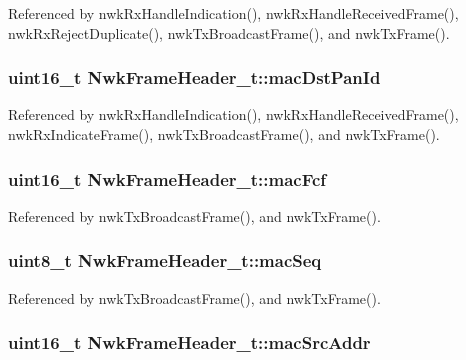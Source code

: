 Referenced by nwk\-Rx\-Handle\-Indication(), nwk\-Rx\-Handle\-Received\-Frame(), nwk\-Rx\-Reject\-Duplicate(), nwk\-Tx\-Broadcast\-Frame(), and nwk\-Tx\-Frame().

\hypertarget{struct_nwk_frame_header__t_a503c00407e350a489337324ea735f421}{
\subsubsection[{mac\-Dst\-Pan\-Id}]{\setlength{\rightskip}{0pt plus 5cm}uint16\-\_\-t Nwk\-Frame\-Header\-\_\-t\-::mac\-Dst\-Pan\-Id}}\label{struct_nwk_frame_header__t_a503c00407e350a489337324ea735f421}


Referenced by nwk\-Rx\-Handle\-Indication(), nwk\-Rx\-Handle\-Received\-Frame(), nwk\-Rx\-Indicate\-Frame(), nwk\-Tx\-Broadcast\-Frame(), and nwk\-Tx\-Frame().

\hypertarget{struct_nwk_frame_header__t_a136fb8b5fae16dc89aa581578163a292}{
\subsubsection[{mac\-Fcf}]{\setlength{\rightskip}{0pt plus 5cm}uint16\-\_\-t Nwk\-Frame\-Header\-\_\-t\-::mac\-Fcf}}\label{struct_nwk_frame_header__t_a136fb8b5fae16dc89aa581578163a292}


Referenced by nwk\-Tx\-Broadcast\-Frame(), and nwk\-Tx\-Frame().

\hypertarget{struct_nwk_frame_header__t_a1a2af294d7235b16d1bff5050fe8c24d}{
\subsubsection[{mac\-Seq}]{\setlength{\rightskip}{0pt plus 5cm}uint8\-\_\-t Nwk\-Frame\-Header\-\_\-t\-::mac\-Seq}}\label{struct_nwk_frame_header__t_a1a2af294d7235b16d1bff5050fe8c24d}


Referenced by nwk\-Tx\-Broadcast\-Frame(), and nwk\-Tx\-Frame().

\hypertarget{struct_nwk_frame_header__t_a8648deb85dac8f29a2109e0e430b1be3}{
\subsubsection[{mac\-Src\-Addr}]{\setlength{\rightskip}{0pt plus 5cm}uint16\-\_\-t Nwk\-Frame\-Header\-\_\-t\-::mac\-Src\-Addr}}\label{struct_nwk_frame_header__t_a8648deb85dac8f29a2109e0e430b1be3}


